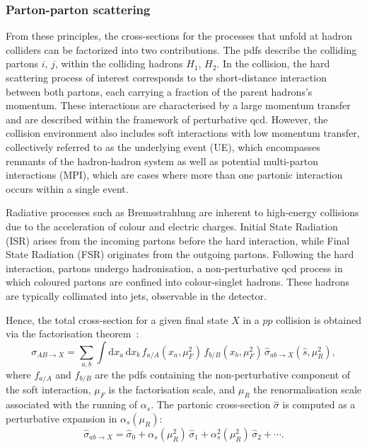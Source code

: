 \subsubsection*{Parton-parton scattering}
\label{subsubsec:proton}
From these principles, the cross-sections for the processes that unfold at hadron colliders can be factorized into two contributions. The \acrshort{pdf}s describe the colliding partons $i$, $j$, within the colliding hadrons $H_{1}$, $H_{2}$. In the collision, the hard scattering process of interest corresponds to the short-distance interaction between both partons, each carrying a fraction of the parent hadrons's momentum. These interactions are characterised by a large momentum transfer and are described within the framework of perturbative \acrshort{qcd}. However, the collision environment also includes soft interactions with low momentum transfer, collectively referred to as the underlying event (UE), which encompasses remnants of the hadron-hadron system as well as potential multi-parton interactions (MPI), which are cases where more than one partonic interaction occurs within a single event.

Radiative processes such as Bremsstrahlung are inherent to high-energy collisions due to the acceleration of colour and electric charges. Initial State Radiation (ISR) arises from the incoming partons before the hard interaction, while Final State Radiation (FSR) originates from the outgoing partons. Following the hard interaction, partons undergo hadronisation, a non-perturbative \acrshort{qcd} process in which coloured partons are confined into colour-singlet hadrons. These hadrons are typically collimated into jets, observable in the detector.

Hence, the total cross-section for a given final state $X$ in a $pp$ collision is obtained via the factorisation theorem~\cite{fact_them,collins2004factorizationhardprocessesqcd}:
\begin{equation}
\sigma_{AB \to X} = \sum_{a,b} \int \mathrm{d}x_a \, \mathrm{d}x_b \, f_{a/A}(x_a, \mu_F^2) \, f_{b/B}(x_b, \mu_F^2) \, \hat{\sigma}_{ab \to X}(\hat{s}, \mu_R^2),
\end{equation}
where $f_{a/A}$ and $f_{b/B}$ are the \acrshort{pdf}s containing the non-perturbative component of the soft interaction, $\mu_F$ is the factorisation scale, and $\mu_R$ the renormalisation scale associated with the running of $\alpha_s$. The partonic cross-section $\hat{\sigma}$ is computed as a perturbative expansion in $\alpha_s(\mu_R)$:
\begin{equation}
\hat{\sigma}_{ab \to X} = \hat{\sigma}_0 + \alpha_s(\mu_R^2)\, \hat{\sigma}_1 + \alpha_s^2(\mu_R^2)\, \hat{\sigma}_2 + \cdots.
\end{equation}


